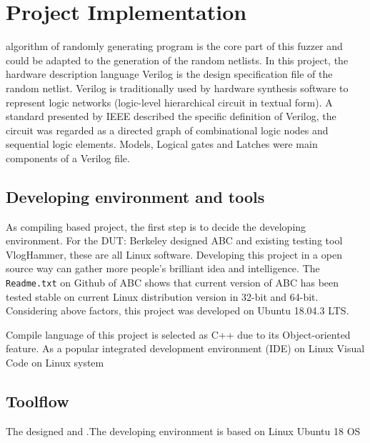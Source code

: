 \chapter{Project Implementation}
\renewcommand{\baselinestretch}{\mystretch}
\label{chap:Fuzzer}
 algorithm of randomly generating program is the core part of this fuzzer and could be adapted to the generation of the random netlists. In this project, the hardware description language Verilog is the design specification file of the random netlist. Verilog is traditionally used by hardware synthesis software to represent logic networks (logic-level hierarchical circuit in textual form). A standard \cite{1620780} presented by IEEE described the specific definition of Verilog, the circuit was regarded as a directed graph of combinational logic nodes and sequential logic elements. Models, Logical gates and Latches were main components of a Verilog file.
\section{Developing environment and tools}
As compiling based project, the first step is to decide the developing environment. For the DUT: Berkeley designed ABC and existing testing tool VlogHammer, these are all Linux software. Developing this project in a open source way can gather more people's brilliant idea and intelligence. The \texttt{Readme.txt} on Github of ABC shows that current version of ABC has been tested stable on current Linux distribution version in 32-bit and 64-bit. Considering above factors, this project was developed on Ubuntu 18.04.3 LTS.

Compile language of this project is selected as C++ due to its Object-oriented feature. As a popular  integrated development environment (IDE) on Linux  Visual Code on Linux system 
\section{Toolflow}
The designed \cite{fujita2018automatic} and \cite{godefroid2007random}.The developing environment is based on Linux Ubuntu 18 OS